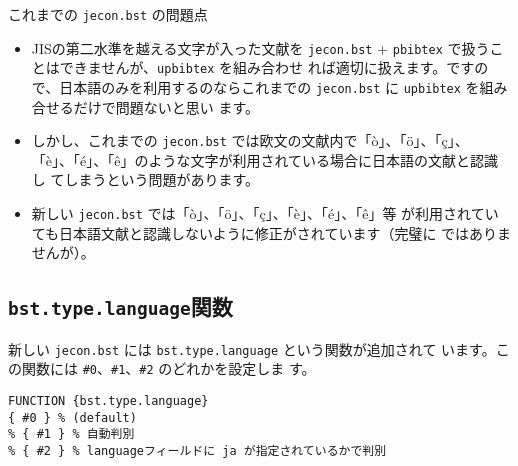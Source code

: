 \documentclass[10pt]{bxjsarticle}
\begin{document}
これまでの \texttt{jecon.bst} の問題点
\begin{itemize}
 \item JISの第二水準を越える文字が入った文献を \texttt{jecon.bst} +
       \texttt{pbibtex} で扱うことはできませんが、\texttt{upbibtex} を組み合わせ
       れば適切に扱えます。ですので、日本語のみを利用するのならこれまでの
       \texttt{jecon.bst} に \texttt{upbibtex} を組み合せるだけで問題ないと思い
       ます。
 \item しかし、これまでの \texttt{jecon.bst}  では欧文の文献内で「ò」、「ö」、「ç」、
       「è」、「é」、「ê」のような文字が利用されている場合に日本語の文献と認識し
       てしまうという問題があります。
 \item 新しい \texttt{jecon.bst} では「ò」、「ö」、「ç」、「è」、「é」、「ê」等
       が利用されていても日本語文献と認識しないように修正がされています（完璧に
       ではありませんが）。
\end{itemize}

\subsection{\texttt{bst.type.language}関数}

新しい \texttt{jecon.bst} には \texttt{bst.type.language} という関数が追加されて
います。この関数には \texttt{\#0}、\texttt{\#1}、\texttt{\#2} のどれかを設定しま
す。
\begin{verbatim}
FUNCTION {bst.type.language}
{ #0 } % (default)
% { #1 } % 自動判別
% { #2 } % languageフィールドに ja が指定されているかで判別
\end{verbatim}
\vspace*{1em}
\end{document}
